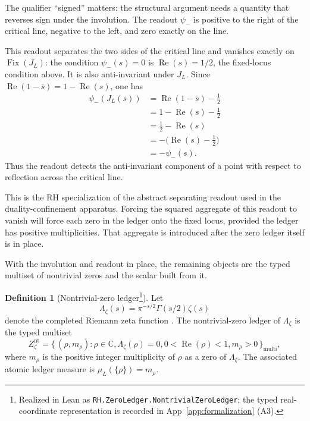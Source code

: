 \documentclass[11pt]{article}
\DeclareMathOperator{\Fix}{Fix}
\DeclareMathOperator{\Real}{Re}
\newcommand{\JL}{J_{L}}
\newcommand{\psimRH}{\psi_{-}}
\newcommand{\Lzeta}{\Lambda_{\zeta}}
\newcommand{\Znt}{Z_{\zeta}^{\mathrm{nt}}}
\theoremstyle{definition}
\newtheorem{definition}[theorem]{Definition}
\begin{document}
The qualifier ``signed'' matters: the structural argument needs a
quantity that reverses sign under the involution.  The readout
\(\psimRH\) is positive to the right of the critical line, negative
to the left, and zero exactly on the line.

This readout separates the two sides of the critical line and
vanishes exactly on \(\Fix(\JL)\): the condition \(\psimRH(s)=0\) is
\(\Real(s)=1/2\), the fixed-locus condition above.  It is also
anti-invariant under \(\JL\).  Since \(\Real(1-\bar{s})=1-\Real(s)\),
one has
\[
\begin{aligned}
  \psimRH(\JL(s))
    &= \Real(1-\bar{s})-\frac{1}{2}  \\
    &= 1-\Real(s)-\frac{1}{2}        \\
    &= \frac{1}{2}-\Real(s)          \\
    &= -\bigl(\Real(s)-\frac{1}{2}\bigr) \\
    &= -\psimRH(s).
\end{aligned}
\]
Thus the readout detects the anti-invariant component of a point with
respect to reflection across the critical line.

This is the RH specialization of the abstract separating readout used
in the duality-confinement apparatus.  Forcing the squared aggregate
of this readout to vanish will force each zero in the ledger onto the
fixed locus, provided the ledger has positive multiplicities.  That
aggregate is introduced after the zero ledger itself is in place.

With the involution and readout in place, the remaining objects are the
typed multiset of nontrivial zeros and the scalar built from it.

\begin{definition}[Nontrivial-zero ledger\footnote{Realized in Lean as \nolinkurl{RH.ZeroLedger.NontrivialZeroLedger}; the typed real-coordinate representation is recorded in App~\ref{app:formalization} (A3).}]
\label{def:rh:nontrivial-zero-ledger}
Let
\[
  \Lzeta(s)=\pi^{-s/2}\Gamma(s/2)\zeta(s)
\]
denote the completed Riemann zeta function
\citep{TitchmarshHeathBrown1986,Edwards1974}.  The nontrivial-zero
ledger of \(\Lzeta\) is the typed multiset
\[
  \Znt
    =
  \bigl\{\,(\rho,m_{\rho}) :
      \rho\in\mathbb{C},
      \Lzeta(\rho)=0,
      0<\Real(\rho)<1,
      m_{\rho}>0
  \,\bigr\}_{\mathrm{multi}},
\]
where \(m_{\rho}\) is the positive integer multiplicity of \(\rho\)
as a zero of \(\Lzeta\).  The associated atomic ledger measure is
\(\mu_{L}(\{\rho\})=m_{\rho}\).
\end{definition}
\end{document}
